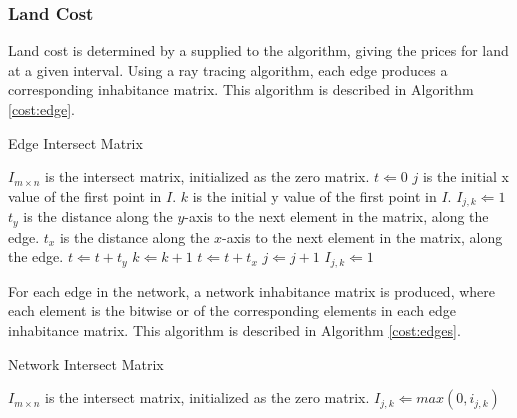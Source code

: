 \documentclass[11pt, oneside, notitlepage, final]{article}
\begin{document}
            \subsubsection{Land Cost}

                Land cost is determined by a supplied to the algorithm, giving the prices for land at a given interval. Using a ray tracing algorithm, each edge produces a corresponding inhabitance matrix. This algorithm is described in Algorithm \ref{cost:edge}.

                \begin{algorithm}
                \caption{Edge Intersect Matrix}
                \label{cost:edge}
                \begin{algorithmic}
                \STATE $I_{m \times n}$ is the intersect matrix, initialized as the zero matrix.
                \STATE $t \Leftarrow 0$
                \STATE $j$ is the initial x value of the first point in $I$.
                \STATE $k$ is the initial y value of the first point in $I$.
                \STATE $I_{j, k} \Leftarrow 1$
                \STATE $t_y$ is the distance along the $y$-axis to the next element in the matrix, along the edge.
                \STATE $t_x$ is the distance along the $x$-axis to the next element in the matrix, along the edge.
                \STATE $t \Leftarrow t + t_y$
                \STATE $k \Leftarrow k + 1$
                \ELSE
                \STATE $t \Leftarrow t + t_x$
                \STATE $j \Leftarrow j + 1$
                \ENDIF
                \STATE $I_{j, k} \Leftarrow 1$
                \ENDWHILE
                \end{algorithmic}
                \end{algorithm}

                For each edge in the network, a network inhabitance matrix is produced, where each element is the bitwise or of the corresponding elements in each edge inhabitance matrix. This algorithm is described in Algorithm \ref{cost:edges}.

                \begin{algorithm}
                \caption{Network Intersect Matrix}
                \label{cost:edges}
                \begin{algorithmic}
                \STATE $I_{m \times n}$ is the intersect matrix, initialized as the zero matrix.
                \STATE $I_{j, k} \Leftarrow max(0, i_{j,k})$
                \ENDFOR
                \ENDFOR
                \ENDFOR
                \end{algorithmic}
                \end{algorithm}
\end{document}
